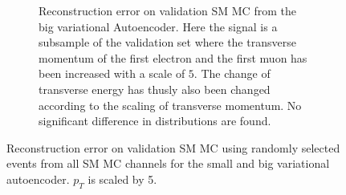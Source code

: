 \begin{figure}[h!]
\begin{subfigure}{.45\textwidth}
        \caption{Reconstruction error on validation SM MC from the big variational Autoencoder. Here the signal is a subsample of the validation 
        set where the transverse momentum of the first electron and the first muon has been increased with a scale of $5$. The change of transverse 
        energy has thusly also been changed according to the scaling of transverse momentum. No significant difference in distributions are found. }
        \label{fig:VAE_big_pt_5}
    \end{subfigure}
    \hfill 
    \caption[VAE | Reconstruction error $p_T$ altering of 5]{Reconstruction error on validation SM MC using randomly selected events from all SM 
    MC channels for the small and big variational autoencoder. $p_T$ is scaled by 5. }
    \label{fig:VAE_big_small_pt_5}
\end{figure}


